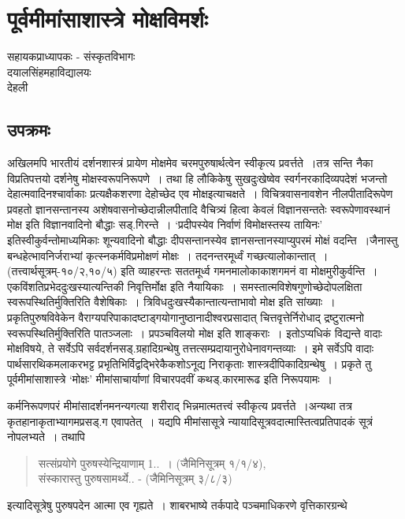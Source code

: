 {\fontsize{15}{17}\selectfont
\presetvalues
\chapter{पूर्वमीमांसाशास्त्रे मोक्षविमर्शः}

\begin{center}
\smallskip

सहायकप्राध्यापकः - संस्कृतविभागः\\
दयालसिंहमहाविद्यालयः\\
देहली
\addrule
\end{center}
 
\section*{उपक्रमः}

अखिलमपि भारतीयं दर्शनशास्त्रं प्रायेण मोक्षमेव चरमपुरुषार्थत्वेन स्वीकृत्य प्रवर्त्तते~।\break तत्र सन्ति नैका विप्रतिपत्तयो दर्शनेषु मोक्षस्वरूपनिरूपणे~। तथा हि लौकिकेषु सुख\-दुःखेष्वेव स्वर्गनरकादिव्यपदेशं भजन्तो देहात्मवादिनश्चार्वाकाः प्रत्यक्षैकशरणा देहोच्छेद एव मोक्ष\break इत्याचक्षते~। विचित्रवासनावशेन नीलपीतादिरूपेण प्रवहतो ज्ञानसन्तानस्य अशेषवासनोच्छे\-दान्नीलपीतादि वैचित्र्यं हित्वा केवलं विज्ञानसन्ततेः स्वरूपेणावस्थानं मोक्ष इति विज्ञानवादिनो बौद्धाः सड्.गिरन्ते~। ‘प्रदीपस्येव निर्वाणं विमोक्षस्तस्य तायिनः’ इतिस्वीकुर्वन्तो\break माध्यमिकाः शून्यवादिनो बौद्धाः दीपसन्तानस्येव ज्ञानसन्तानस्याप्युपरमं मोक्षं वदन्ति~।\break जैनास्तु  बन्धहेत्भावनिर्जराभ्यां कृत्स्नकर्मविप्रमोक्षणं मोक्षः~। तदनन्तरमूर्ध्वं गच्छत्या\-\break लोकान्तात्~। (तत्त्वार्थसूत्रम्-१०/२,१०/५) इति व्याहरन्तः सततमूर्ध्व गमनमालोकाकाश\-गमनं वा मोक्षमुरीकुर्वन्ति~। एकविंशतिप्रभेददुःखस्यात्यन्तिकी निवृत्तिर्मोक्ष इति नैयायिकाः~। समस्तात्मविशेषगुणोच्छेदोपलक्षिता स्वरूपस्थितिर्मुक्तिरिति वैशेषिकाः~। त्रिविधदुःखस्यैकान्तात्यन्ताभावो मोक्ष इति सांख्याः~। प्रकृतिपुरुषविवेकेन वैराग्यपरिपाकादष्टाड्गयोगानुष्ठा\-नादीश्वरप्रसादात् चित्तवृत्तेर्निरोधाद् द्रष्टुरात्मनो स्वरूपस्थितिर्मुक्तिरिति पातञ्जलाः~। प्रपञ्च\-विलयो मोक्ष इति शाङ्कराः~। इतोऽप्यधिकं विद्यन्ते वादाः मोक्षविषये, ते सर्वेऽपि सर्वदर्शनसड्.ग्रहादिग्रन्थेषु तत्तत्सम्प्रदायानुरोधेनावगन्तव्याः~। इमे सर्वेऽपि वादाः पार्थसारथिकमलाकरभट्ट प्रभृतिभिर्विद्वद्भिरेकैकशोऽनूद्य निराकृताः शास्त्रदीपिकादिग्रन्थेषु~। प्रकृते तु पूर्वमीमांसा\-शास्त्रे ‘मोक्षः’ मीमांसाचार्याणां विचारपदवीं कथड्.कारमारूढ इति निरूपयामः~। 

कर्मनिरूपणपरं मीमांसादर्शनमनन्यगत्या शरीराद् भिन्नमात्मतत्त्वं स्वीकृत्य प्रवर्त्तते~।\break अन्यथा तत्र कृतहानाकृताभ्यागमप्रसड्.ग एवापतेत्~। यद्यपि मीमांसासूत्रे न्यायादिसूत्रवदात्मास्तित्वप्रतिपादकं सूत्रं नोपलभ्यते~। तथापि 
\begin{verse}
सत्संप्रयोगे पुरुषस्येन्द्रियाणाम् 1..~। (जैमिनिसूत्रम् १/­१/४), \\
संस्कारास्तु पुरुषसामर्थ्ये.. - (जैमिनिसूत्रम् ३/­८/३) 
\end{verse}
इत्यादिसूत्रेषु पुरुषपदेन आत्मा एव गृह्यते~। शाबरभाष्ये तर्कपादे पञ्चमाधिकरणे वृत्तिकारग्रन्थे 

}

